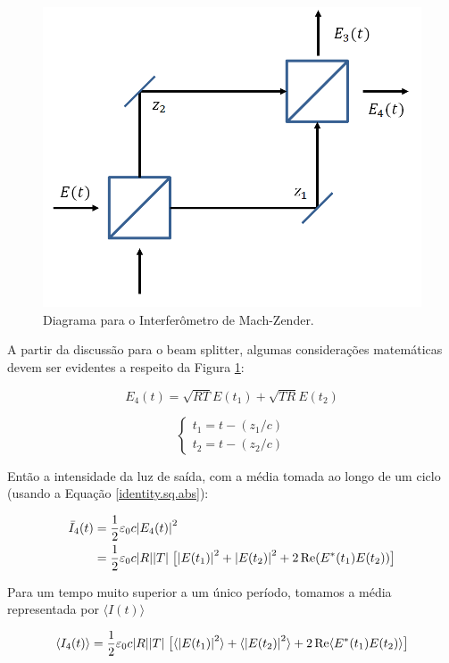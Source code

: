 \documentclass[12pt,a4paper]{report}
\begin{document}
\begin{figure}[H]
    \centering
    \includegraphics[width=0.5\linewidth]{mach zender loudon.png}
    \caption{Diagrama para o Interferômetro de Mach-Zender.}
    \label{mach.zender.diagram}
\end{figure}

A partir da discussão para o beam splitter, algumas considerações matemáticas devem ser evidentes a respeito da Figura \ref{mach.zender.diagram}:

\begin{equation}
    E_4(t)=\sqrt{RT}E(t_1)+\sqrt{TR}E(t_2)
\end{equation}

\begin{equation*}
    \begin{cases}
        t_1=t-(z_1/c)\\
        t_2=t-(z_2/c)
    \end{cases}
\end{equation*}

Então a intensidade da luz de saída, com a média tomada ao longo de um ciclo (usando a Equação \ref{identity.sq.abs}):

\begin{align}
    \bar{I}_4(t) & = \frac{1}{2}\varepsilon_0c\abs{E_4(t)}^2\\
                 & = \frac{1}{2}\varepsilon_0c\abs{R}\abs{T}\;\bigr[\abs{E(t_1)}^2+\abs{E(t_2)}^2+2\Re(E^*(t_1)E(t_2))\bigr]\\
\end{align}

Para um tempo muito superior a um único período, tomamos a média representada por $\langle I(t) \rangle$

\begin{equation}
    \langle I _4(t)\rangle=\frac{1}{2}\varepsilon_0c\abs{R}\abs{T}\;\bigr[\langle \abs{E(t_1)}^2\rangle+\langle \abs{E(t_2)}^2\rangle+2\Re\langle E^*(t_1)E(t_2)\rangle \bigl]
\end{equation}
\end{document}
